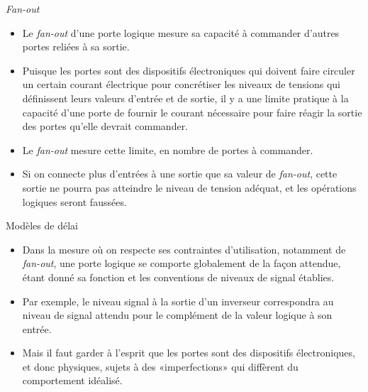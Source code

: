 \documentclass[presentation]{beamer}
\begin{document}
\begin{frame}[label={sec:org0a4b43a}]{\emph{Fan-out}}
\begin{itemize}
\item Le \emph{fan-out} d'une porte logique mesure sa capacité à commander d'autres portes reliées à sa sortie.

\item Puisque les portes sont des dispositifs électroniques qui doivent faire circuler un certain courant électrique pour concrétiser les niveaux de tensions qui définissent leurs valeurs d'entrée et de sortie, il y a une limite pratique à la capacité d'une porte de fournir le courant nécessaire pour faire réagir la sortie des portes qu'elle devrait commander.

\item Le \emph{fan-out} mesure cette limite, en nombre de portes à commander.

\item Si on connecte plus d'entrées à une sortie que sa valeur de \emph{fan-out}, cette sortie ne pourra pas atteindre le niveau de tension adéquat, et les opérations logiques seront faussées.
\end{itemize}
\end{frame}

\begin{frame}[label={sec:org0a92855}]{Modèles de délai}
\begin{itemize}
\item Dans la mesure où on respecte ses contraintes d'utilisation, notamment de \emph{fan-out}, une porte logique se comporte globalement de la façon attendue, étant donné sa fonction et les conventions de niveaux de signal établies.

\item Par exemple, le niveau signal à la sortie d'un inverseur correspondra au niveau de signal attendu pour le complément de la valeur logique à son entrée.

\item Mais il faut garder à l'esprit que les portes sont des dispositifs électroniques, et donc physiques, sujets à des «imperfections» qui diffèrent du comportement idéalisé.
\end{itemize}
\end{frame}
\end{document}
